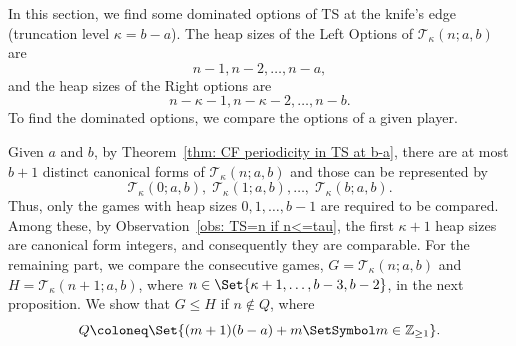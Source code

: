 \documentclass[oneside,reqno]{amsart}
\newcommand{\ts}{\mathcal{T}}
\begin{document}
\iffalse
In this section, we find some dominated options of {\sc TS} at the knife's edge (truncation level $\kappa=b-a$). The heap sizes of the Left Options of $\ts_\kappa(n;a,b)$ are 
$$n-1,n-2,\dots,n-a,$$ and the heap sizes of the Right options are $$n-\kappa-1,n-\kappa-2,\dots,n-b.$$ To find the dominated options, we compare the options of a given player. 

Given $a$ and $b$, by Theorem~\ref{thm: CF periodicity in TS at b-a}, there are at most $b+1$ distinct canonical forms of $\ts_\kappa(n;a,b)$ and those can be represented by  $$\ts_\kappa(0;a,b),\;\ts_\kappa(1;a,b),\dots,\;\ts_\kappa(b;a,b).$$ Thus, only the games with heap sizes $0,1,\dots,b-1$ are required to be compared. Among these, by Observation~\ref{obs: TS=n if n<=tau}, the first $\kappa+1$ heap sizes are canonical form integers, and consequently they are comparable. For the remaining part, we compare the consecutive games, $G=\ts_{\kappa}(n;a,b)$ and $H=\ts_{\kappa}(n+1;a,b)$, where $n\in \Set{\kappa+1,\dots,b-3,b-2}$, in the next proposition. We show that $G\le H$ if $n\notin  Q$, where $$Q\coloneq\Set{(m+1)(b-a)+m\SetSymbol m\in \mathbb Z_{\geq 1}}.$$
\end{document}
